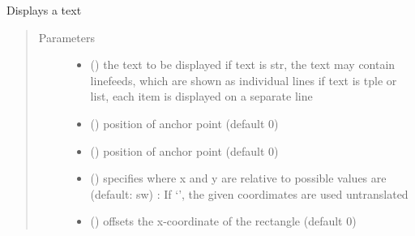 \documentclass[letterpaper,10pt,english]{sphinxmanual}
\begin{document}

\begin{fulllineitems}
\label{\detokenize{Reference:salabim.AnimateText}}
Displays a text
\begin{quote}\begin{description}
\item[{Parameters}] \leavevmode\begin{itemize}
\item {} 
 (\sphinxstyleliteralemphasis{\sphinxupquote{, }}) \textendash{} the text to be displayed 
if text is str, the text may contain linefeeds, which are shown as individual lines
if text is tple or list, each item is displayed on a separate line

\item {} 
 () \textendash{} position of anchor point (default 0)

\item {} 
 () \textendash{} position of anchor point (default 0)

\item {} 
 () \textendash{} specifies where x and y are relative to 
possible values are (default: sw) : 
If ‘’, the given coordimates are used untranslated

\item {} 
 () \textendash{} offsets the x-coordinate of the rectangle (default 0)


\end{itemize}
\end{description}
\end{quote}
\end{fulllineitems}
\end{document}
